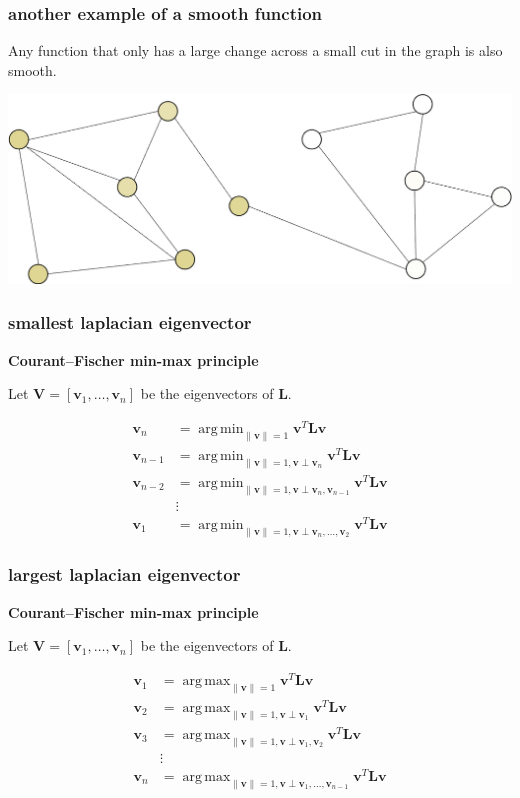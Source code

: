 \documentclass[compress]{beamer}
\newcommand{\bv}[1]{\mathbf{#1}}
\DeclareMathOperator*{\argmin}{arg\,min}
\DeclareMathOperator*{\argmax}{arg\,max}
\begin{document}
\begin{frame}[t]
	\frametitle{another example of a smooth function}
	Any function that only has a large change across a small cut in the graph is also smooth. 
	\begin{center}
		\includegraphics[width=.8\textwidth]{smooth_func2.png}
	\end{center}
\end{frame}

\begin{frame}
	\frametitle{smallest laplacian eigenvector}
	\begin{center}
		\textbf{Courant–Fischer min-max principle}
	\end{center}
	Let $\bv{V} = [\bv{v}_1,\ldots,\bv{v}_n]$ be the eigenvectors of $\bv{L}$.
	
	\begin{align*}
		\bv{v}_n &= \argmin_{\|\bv{v}\|=1} \bv{v}^T\bv{L}\bv{v} \\
		\bv{v}_{n-1} &= \argmin_{\|\bv{v}\|=1,\bv{v} \perp \bv{v}_n} \bv{v}^T\bv{L}\bv{v} \\
		\bv{v}_{n-2}  &= \argmin_{\|\bv{v}\|=1,\bv{v} \perp \bv{v}_n,\bv{v}_{n-1}} \bv{v}^T\bv{L}\bv{v} \\
		&\vdots \\
		\bv{v}_1 &= \argmin_{\|\bv{v}\|=1,\bv{v} \perp \bv{v}_n,\ldots,\bv{v}_2} \bv{v}^T\bv{L}\bv{v} 
	\end{align*}
\end{frame}

\begin{frame}
	\frametitle{largest laplacian eigenvector}
	\begin{center}
		\textbf{Courant–Fischer min-max principle}
	\end{center}
	Let $\bv{V} = [\bv{v}_1,\ldots,\bv{v}_n]$ be the eigenvectors of $\bv{L}$.
	
	\begin{align*}
		\bv{v}_1 &= \argmax_{\|\bv{v}\|=1} \bv{v}^T\bv{L}\bv{v} \\
		\bv{v}_2 &= \argmax_{\|\bv{v}\|=1,\bv{v} \perp \bv{v}_1} \bv{v}^T\bv{L}\bv{v} \\
		\bv{v}_3 &= \argmax_{\|\bv{v}\|=1,\bv{v} \perp \bv{v}_1,\bv{v}_2} \bv{v}^T\bv{L}\bv{v} \\
		&\vdots \\
		\bv{v}_n &= \argmax_{\|\bv{v}\|=1,\bv{v} \perp \bv{v}_1,\ldots,\bv{v}_{n-1}} \bv{v}^T\bv{L}\bv{v} 
	\end{align*}
\end{frame}
\end{document}
